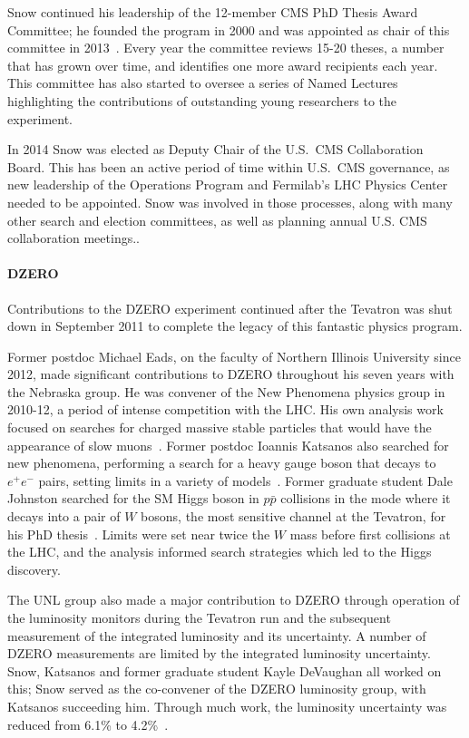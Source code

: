 Snow continued his leadership of the 12-member CMS PhD Thesis Award Committee; he founded the program in 2000 and was appointed as chair of this committee in 2013~\cite{bib:thesisawardwebsite}.  Every year the committee reviews 15-20 theses, a number that has grown over time, and identifies one more award recipients each year.  This committee has also started to oversee a series of Named Lectures highlighting the contributions of outstanding young researchers to the experiment.

In 2014 Snow was elected as Deputy Chair of the U.S.~CMS Collaboration Board.  This has been an active period of time within U.S.~CMS governance, as new leadership of the Operations Program and Fermilab's LHC Physics Center needed to be appointed.  Snow was involved in those processes, along with many other search and election committees, as well as planning annual U.S. CMS collaboration meetings..

\paragraph{DZERO} Contributions to the DZERO experiment continued after the Tevatron was shut down in September 2011 to complete the legacy of this fantastic physics program.

Former postdoc Michael Eads, on the faculty of Northern Illinois University since 2012, made significant contributions to DZERO throughout his seven years with the Nebraska group. He was convener of the New Phenomena physics group in 2010-12, a period of intense competition with the LHC. His own analysis work focused on searches for charged massive stable particles that would have the appearance of slow muons~\cite{bib:slowmuons}.  Former postdoc Ioannis Katsanos also searched for new phenomena, performing a search for a heavy gauge boson that decays to $e^+e^-$ pairs, setting limits in a variety of models~\cite{bib:IKheavyZ}.   Former graduate student Dale Johnston searched for the SM Higgs boson in $p\bar{p}$ collisions in the mode where it decays into a pair of $W$ bosons, the most sensitive channel at the Tevatron, for his PhD thesis~\cite{bib:dalethesis}.   Limits were set near twice the $W$ mass before first collisions at the LHC, and the analysis informed search strategies which led to the Higgs discovery.

The UNL group also made a major contribution to DZERO through operation of the luminosity monitors during the Tevatron run and the subsequent measurement of the integrated luminosity and its uncertainty. A number of DZERO measurements are limited by the integrated luminosity uncertainty.  Snow, Katsanos and former graduate student Kayle DeVaughan  all worked on this; Snow served as the co-convener of the DZERO luminosity group, with Katsanos succeeding him. Through much work, the luminosity uncertainty was reduced from 6.1\% to 4.2\%~\cite{bib:D0lumi}.

